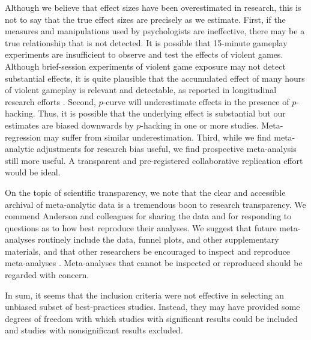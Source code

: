 \documentclass[man]{apa6}
\begin{document}

Although we believe that effect sizes have been overestimated in research, this is not to say that the true effect sizes are precisely as we estimate. First, if the measures and manipulations used by psychologists are ineffective, there may be a true relationship that is not detected. It is possible that 15-minute gameplay experiments are insufficient to observe and test the effects of violent games. Although brief-session experiments of violent game exposure may not detect substantial effects, it is quite plausible that the accumulated effect of many hours of violent gameplay is relevant and detectable, as reported in longitudinal research efforts \citep[e.g.,][]{Willoughby:etal:2012}. Second, $p$-curve will underestimate effects in the presence of $p$-hacking. Thus, it is possible that the underlying effect is substantial but our estimates are biased downwards by $p$-hacking in one or more studies. Meta-regression may suffer from similar underestimation. Third, while we find meta-analytic adjustments for research bias useful, we find prospective meta-analysis still more useful. A transparent and pre-registered collaborative replication effort would be ideal.

On the topic of scientific transparency, we note that the clear and accessible archival of meta-analytic data is a tremendous boon to research transparency. We commend Anderson and colleagues for sharing the data and for responding to questions as to how best reproduce their analyses. We suggest that future meta-analyses routinely include the data, funnel plots, and other supplementary materials, and that other researchers be encouraged to inspect and reproduce meta-analyses \citep{Lakens:etal:InPress}. Meta-analyses that cannot be inspected or reproduced should be regarded with concern.

In sum, it seems that the inclusion criteria were not effective in selecting an unbiased subset of best-practices studies. Instead, they may have provided some degrees of freedom with which studies with significant results could be included and studies with nonsignificant results excluded. %
\end{document}
